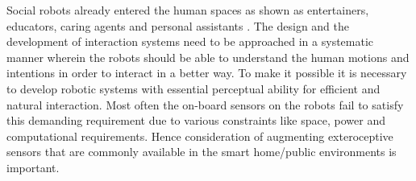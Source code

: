 \documentclass{llncs}
\begin{document}
	Social robots already entered the human spaces as shown as entertainers, educators, caring agents and personal assistants \cite{Aldebaran}. The design and the development of interaction systems need to be approached in a systematic manner wherein the robots should be able to understand the human motions and intentions in order to interact in a better way. To make it possible it is necessary to develop robotic systems with essential perceptual ability for efficient and natural interaction. Most often the on-board sensors on the robots fail to satisfy this demanding requirement due to various constraints like space, power and computational requirements. Hence consideration of augmenting exteroceptive sensors that are commonly available in the smart home/public environments is important.
	
\end{document}
